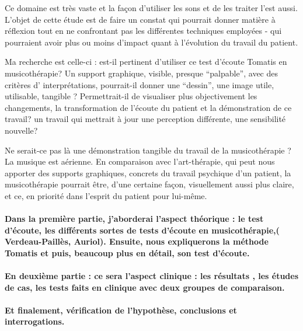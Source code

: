 Ce domaine est très vaste et la façon d'utiliser les sons et de les
traiter l'est aussi. L'objet de cette étude est de faire un constat
qui pourrait donner matière à réflexion tout en ne confrontant pas
les différentes techniques employées - qui pourraient avoir plus ou
moins d'impact quant à l'évolution du travail du patient.

Ma recherche est celle-ci : est-il pertinent d'utiliser ce test d'écoute
Tomatis en musicothérapie? Un support graphique, visible, presque
``palpable'', avec des critères d' interprétations, pourrait-il
donner une ``dessin'', une image utile, utilisable, tangible ? Permettrait-il
de visualiser plus objectivement les changements, la transformation
de l'écoute du patient et la démonstration de ce travail? un travail
qui mettrait à jour une perception différente, une sensibilité nouvelle?

Ne serait-ce pas là une démonstration tangible du travail de la musicothérapie
? La musique est aérienne. En comparaison avec l'art-thérapie, qui
peut nous apporter des supports graphiques, concrets du travail psychique
d'un patient, la musicothérapie pourrait être, d'une certaine façon,
visuellement aussi plus claire, et ce, en priorité dans l'esprit du
patient pour lui-même. 

 
 

\paragraph{{\tiny{\normalsize  Dans la première partie, j'aborderai l'aspect théorique : le test}}
d'écoute, les différents sortes de tests d'écoute en musicothérapie,(
Verdeau-Paillès, Auriol). Ensuite, nous expliquerons la méthode Tomatis
et puis, beaucoup plus en détail, son test d'écoute. }

\paragraph{En deuxième partie : ce sera l'aspect clinique : les résultats ,
les études de cas, les tests faits en clinique avec deux groupes de
comparaison.}

\paragraph{Et finalement, vérification de l'hypothèse, conclusions et interrogations.}
